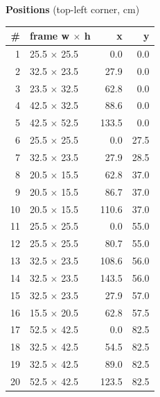 \documentclass[a4paper,landscape,10pt]{article}
\begin{document}
\begin{minipage}[t]{0.25\textwidth}
\vspace{8pt}
{\bfseries Positions} (top-left corner, cm)\\[2pt]
\tiny
\begin{tabular}{@{}r l r r@{}}
\toprule
\# & frame w $\times$ h & x & y \\
\midrule
1 & 25.5 $\times$ 25.5 & 0.0 & 0.0 \\
2 & 32.5 $\times$ 23.5 & 27.9 & 0.0 \\
3 & 23.5 $\times$ 32.5 & 62.8 & 0.0 \\
4 & 42.5 $\times$ 32.5 & 88.6 & 0.0 \\
5 & 42.5 $\times$ 52.5 & 133.5 & 0.0 \\
6 & 25.5 $\times$ 25.5 & 0.0 & 27.5 \\
7 & 32.5 $\times$ 23.5 & 27.9 & 28.5 \\
8 & 20.5 $\times$ 15.5 & 62.8 & 37.0 \\
9 & 20.5 $\times$ 15.5 & 86.7 & 37.0 \\
10 & 20.5 $\times$ 15.5 & 110.6 & 37.0 \\
11 & 25.5 $\times$ 25.5 & 0.0 & 55.0 \\
12 & 25.5 $\times$ 25.5 & 80.7 & 55.0 \\
13 & 32.5 $\times$ 23.5 & 108.6 & 56.0 \\
14 & 32.5 $\times$ 23.5 & 143.5 & 56.0 \\
15 & 32.5 $\times$ 23.5 & 27.9 & 57.0 \\
16 & 15.5 $\times$ 20.5 & 62.8 & 57.5 \\
17 & 52.5 $\times$ 42.5 & 0.0 & 82.5 \\
18 & 32.5 $\times$ 42.5 & 54.5 & 82.5 \\
19 & 32.5 $\times$ 42.5 & 89.0 & 82.5 \\
20 & 52.5 $\times$ 42.5 & 123.5 & 82.5 \\
\bottomrule
\end{tabular}
\end{minipage}
\clearpage
\end{document}
